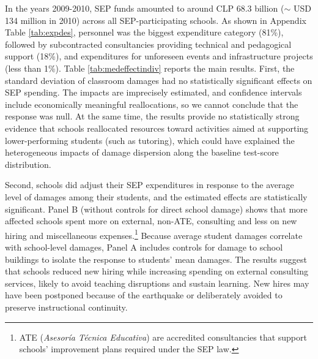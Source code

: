 In the years 2009-2010, SEP funds amounted to around CLP 68.3 billion ($\sim$ USD 134 million in 2010) across all SEP-participating schools. As shown in Appendix Table \ref{tab:expdes}, personnel was the biggest expenditure category (81\%), followed by subcontracted consultancies providing technical and pedagogical support (18\%), and expenditures for unforeseen events and infrastructure projects (less than 1\%). 
Table \ref{tab:medeffectindiv} reports the main results. First, the standard deviation of classroom damages had no statistically significant effects on SEP spending. The impacts are imprecisely estimated, and confidence intervals include economically meaningful reallocations, so we cannot conclude that the response was null. At the same time, the results provide no statistically strong evidence that schools reallocated resources toward activities aimed at supporting lower-performing students (such as tutoring), which could have explained the heterogeneous impacts of damage dispersion along the baseline test-score distribution.\par 





Second, schools did adjust their SEP expenditures in response to the average level of damages among their students, and the estimated effects are statistically significant. Panel B (without controls for direct school damage) shows that more affected schools spent more on external, non-ATE, consulting and less on new hiring and miscellaneous expenses.\footnote{ATE ({\itshape Asesor\'{i}a T\'{e}cnica Educativa}) are accredited consultancies that support schools' improvement plans required under the SEP law. }  Because average student damages correlate with school-level damages, Panel A includes controls for damage to school buildings to isolate the response to students’ mean damages. The results suggest that schools reduced new hiring while increasing spending on external consulting services, likely to avoid teaching disruptions and sustain learning. New hires may have been postponed because of the earthquake or deliberately avoided to preserve instructional continuity.\par 

